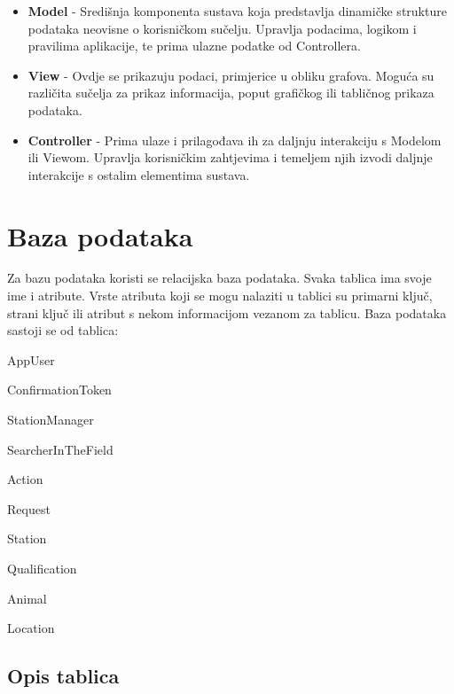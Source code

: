 	\begin{itemize}
		\item \textbf{Model} - Središnja komponenta sustava koja predstavlja dinamičke strukture podataka neovisne o korisničkom sučelju. Upravlja podacima, logikom i pravilima aplikacije, te prima ulazne podatke od Controllera.
		\item \textbf{View} - Ovdje se prikazuju podaci, primjerice u obliku grafova. Moguća su različita sučelja za prikaz informacija, poput grafičkog ili tabličnog prikaza podataka.
		\item \textbf{Controller} - Prima ulaze i prilagođava ih za daljnju interakciju s Modelom ili Viewom. Upravlja korisničkim zahtjevima i temeljem njih izvodi daljnje interakcije s ostalim elementima sustava.
	\end{itemize}
		

		

				
		\section{Baza podataka}
				
				Za bazu podataka koristi se relacijska baza podataka. Svaka tablica ima svoje ime i atribute. Vrste atributa koji se mogu nalaziti u tablici su primarni ključ, strani ključ ili atribut s nekom informacijom vezanom za tablicu. Baza podataka sastoji se od tablica:
		
				\begin{packed_item}
					\item AppUser
					\item ConfirmationToken
					\item StationManager
					\item SearcherInTheField
					\item Action
					\item Request
					\item Station
					\item Qualification
					\item Animal
					\item Location
				\end{packed_item}
				
				
		
			\subsection{Opis tablica}
			

